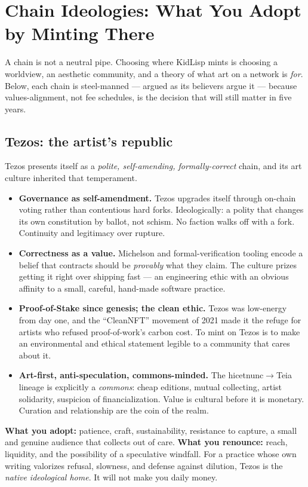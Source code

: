 \documentclass[10pt,letterpaper,twocolumn]{article}
\begin{document}
\section{Chain Ideologies: What You Adopt by Minting There}

A chain is not a neutral pipe. Choosing where KidLisp mints is choosing a worldview, an aesthetic community, and a theory of what art on a network is \emph{for}. Below, each chain is steel-manned --- argued as its believers argue it --- because values-alignment, not fee schedules, is the decision that will still matter in five years.

\subsection{Tezos: the artist's republic}

Tezos presents itself as a \emph{polite, self-amending, formally-correct} chain, and its art culture inherited that temperament.

\begin{itemize}
  \item \textbf{Governance as self-amendment.} Tezos upgrades itself through on-chain voting rather than contentious hard forks. Ideologically: a polity that changes its own constitution by ballot, not schism. No faction walks off with a fork. Continuity and legitimacy over rupture.
  \item \textbf{Correctness as a value.} Michelson and formal-verification tooling encode a belief that contracts should be \emph{provably} what they claim. The culture prizes getting it right over shipping fast --- an engineering ethic with an obvious affinity to a small, careful, hand-made software practice.
  \item \textbf{Proof-of-Stake since genesis; the clean ethic.} Tezos was low-energy from day one, and the ``CleanNFT'' movement of 2021 made it the refuge for artists who refused proof-of-work's carbon cost. To mint on Tezos is to make an environmental and ethical statement legible to a community that cares about it.
  \item \textbf{Art-first, anti-speculation, commons-minded.} The hicetnunc$\rightarrow$Teia lineage is explicitly a \emph{commons}: cheap editions, mutual collecting, artist solidarity, suspicion of financialization. Value is cultural before it is monetary. Curation and relationship are the coin of the realm.
\end{itemize}

\noindent\textbf{What you adopt:} patience, craft, sustainability, resistance to capture, a small and genuine audience that collects out of care. \textbf{What you renounce:} reach, liquidity, and the possibility of a speculative windfall. For a practice whose own writing valorizes refusal, slowness, and defense against dilution, Tezos is the \emph{native ideological home}. It will not make you daily money.
\end{document}
